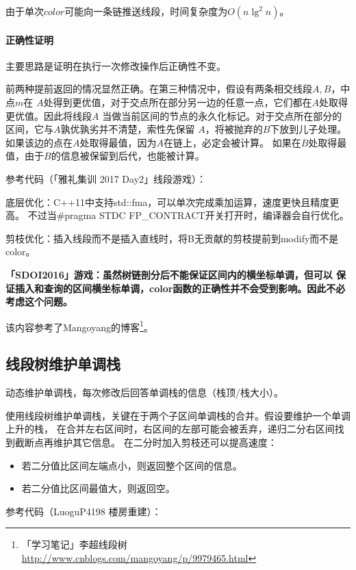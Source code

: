 由于单次$color$可能向一条链推送线段，时间复杂度为$O(n\lg^2 n)$。

\paragraph{正确性证明} 主要思路是证明在执行一次修改操作后正确性不变。

前两种提前返回的情况显然正确。在第三种情况中，假设有两条相交线段$A,B$，中点$m$在
$A$处得到更优值，对于交点所在部分另一边的任意一点，它们都在$A$处取得更优值。因此将线段$A$
当做当前区间的节点的永久化标记。对于交点所在部分的区间，它与$A$孰优孰劣并不清楚，索性先保留
$A$，将被抛弃的$B$下放到儿子处理。如果该边的点在$A$处取得最值，因为$A$在链上，必定会被计算。
如果在$B$处取得最值，由于$B$的信息被保留到后代，也能被计算。

参考代码（「雅礼集训 2017 Day2」线段游戏）：


底层优化：C++11中支持std::fma，可以单次完成乘加运算，速度更快且精度更高。
不过当\#pragma STDC FP\_CONTRACT开关打开时，编译器会自行优化。

剪枝优化：插入线段而不是插入直线时，将B无贡献的剪枝提前到modify而不是color。

{\bfseries 「SDOI2016」游戏：虽然树链剖分后不能保证区间内的横坐标单调，但可以
保证插入和查询的区间横坐标单调，color函数的正确性并不会受到影响。因此不必考虑这个问题。}

该内容参考了Mangoyang的博客\footnote{
    「学习笔记」李超线段树
    \url{http://www.cnblogs.com/mangoyang/p/9979465.html}
}。
\subsection{线段树维护单调栈}
动态维护单调栈，每次修改后回答单调栈的信息（栈顶/栈大小）。

使用线段树维护单调栈，关键在于两个子区间单调栈的合并。假设要维护一个单调上升的栈，
在合并左右区间时，右区间的左部可能会被丢弃，递归二分右区间找到截断点再维护其它信息。
在二分时加入剪枝还可以提高速度：
\begin{itemize}
    \item 若二分值比区间左端点小，则返回整个区间的信息。
    \item 若二分值比区间最值大，则返回空。
\end{itemize}

参考代码（LuoguP4198 楼房重建）：

